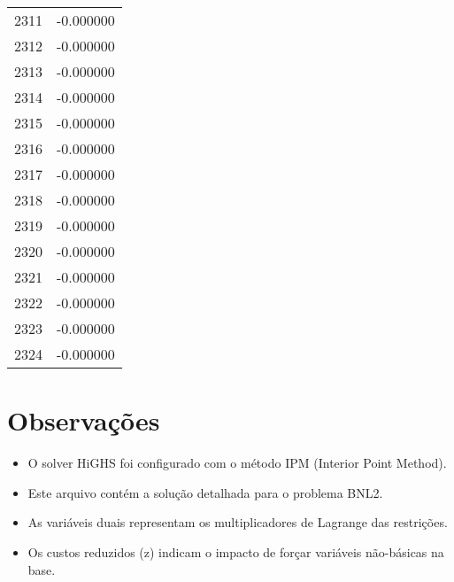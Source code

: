 \documentclass[12pt]{article}
\begin{document}
\begin{longtable}{@{}cc@{}}
2311 & -0.000000 \\
2312 & -0.000000 \\
2313 & -0.000000 \\
2314 & -0.000000 \\
2315 & -0.000000 \\
2316 & -0.000000 \\
2317 & -0.000000 \\
2318 & -0.000000 \\
2319 & -0.000000 \\
2320 & -0.000000 \\
2321 & -0.000000 \\
2322 & -0.000000 \\
2323 & -0.000000 \\
2324 & -0.000000 \\

\end{longtable}


\section{Observações}

\begin{itemize}
\item O solver HiGHS foi configurado com o método IPM (Interior Point Method).
\item Este arquivo contém a solução detalhada para o problema BNL2.
\item As variáveis duais representam os multiplicadores de Lagrange das restrições.
\item Os custos reduzidos (z) indicam o impacto de forçar variáveis não-básicas na base.
\end{itemize}
\end{document}
